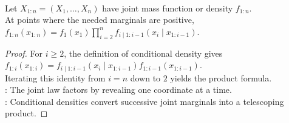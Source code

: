 \begin{proposition} \label{prop:finite-dimensional-chain-rule-processes} \\
Let $X_{1:n}=(X_1,\ldots,X_n)$ have joint mass function or density $f_{1:n}$.\\
At points where the needed marginals are positive, $f_{1:n}(x_{1:n})=f_1(x_1)\prod\limits_{i=2}^{n}f_{i\mid1:i-1}(x_i\mid x_{1:i-1})$.
\begin{proof}
For $i\geq2$, the definition of conditional density gives $f_{1:i}(x_{1:i})=f_{i\mid1:i-1}(x_i\mid x_{1:i-1})f_{1:i-1}(x_{1:i-1})$.\\
Iterating this identity from $i=n$ down to $2$ yields the product formula.\\
: The joint law factors by revealing one coordinate at a time.\\
: Conditional densities convert successive joint marginals into a telescoping product.
\end{proof}
\end{proposition}
